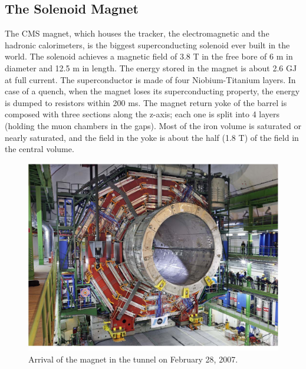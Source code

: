 \subsection*{The Solenoid Magnet}
The CMS magnet, which houses the tracker, the electromagnetic and the hadronic
calorimeters, is the biggest superconducting solenoid ever built in the world. The solenoid
achieves a magnetic field of 3.8 T in the free bore of 6 m in diameter and 12.5 m in length.
The energy stored in the magnet is about 2.6 GJ at full current. The superconductor is
made of four Niobium-Titanium layers. In case of a quench, when the magnet loses its
superconducting property, the energy is dumped to resistors within 200 ms. The magnet
return yoke of the barrel is composed with three sections along the z-axis; each one is
split into 4 layers (holding the muon chambers in the gaps). Most of the iron volume is
saturated or nearly saturated, and the field in the yoke is about the half (1.8 T) of the
field in the central volume.

\begin{figure}
\centering
\includegraphics[scale= 0.35]{../Cap2/magnet}
\caption{Arrival of the magnet in the tunnel on February 28, 2007.}
\label{hcal}
\end{figure}


